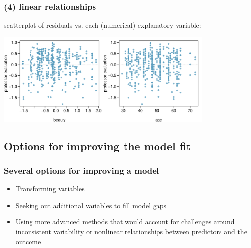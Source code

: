 \begin{frame}[fragile]
\frametitle{(4) linear relationships}

scatterplot of residuals vs. each (numerical) explanatory variable:

\begin{center}
\includegraphics[width=0.8\textwidth]{9-3_model_cond/figures/beauty/linear}
\end{center}



\end{frame}


\subsection{Options for improving the model fit}


\begin{frame}
\frametitle{Several options for improving a model}

\begin{itemize}

\item Transforming variables
\item Seeking out additional variables to fill model gaps
\item Using more advanced methods that would account for challenges around inconsistent variability or nonlinear relationships between predictors and the outcome

\end{itemize}

\end{frame}

